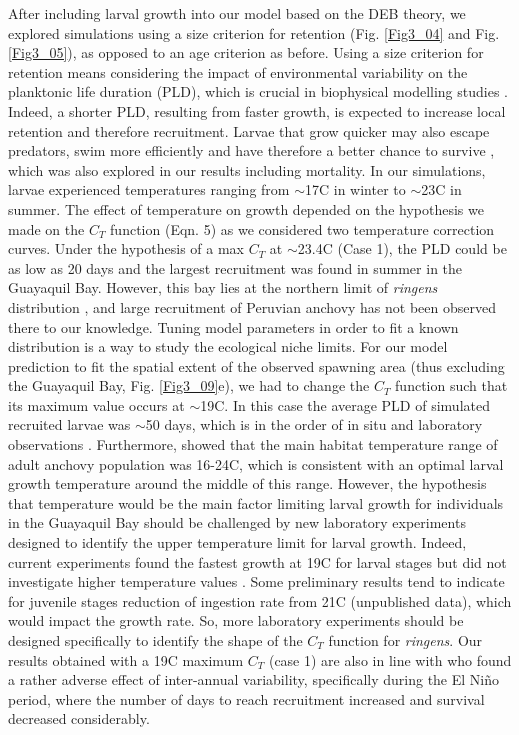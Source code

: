 After including larval growth into our model based on the DEB theory, we explored simulations using a size criterion for retention (Fig. \ref{Fig3_04} and Fig. \ref{Fig3_05}), as opposed to an age criterion as before. Using a size criterion for retention means considering the impact of environmental variability on the planktonic life duration (PLD), which is crucial in biophysical modelling studies \citep{Lett2010}. Indeed, a shorter PLD, resulting from faster growth, is expected to increase local retention and therefore recruitment. Larvae that grow quicker may also escape predators, swim more efficiently and have therefore a better chance to survive \citep{Houd2008}, which was also explored in our results including mortality. In our simulations, larvae experienced temperatures ranging from $\sim$17\textdegree C in winter to $\sim$23\textdegree C in summer. The effect of temperature on growth depended on the hypothesis we made on the $C_T$ function (Eqn. 5) as we considered two temperature correction curves. Under the hypothesis of a max $C_T$ at $\sim$23.4\textdegree C (Case 1), the PLD could be as low as 20 days and the largest recruitment was found in summer in the Guayaquil Bay. However, this bay lies at the northern limit of \textit{\gls{ringens}} distribution \citep{CaldAyor2020}, and large recruitment of Peruvian anchovy has not been observed there to our knowledge. Tuning model parameters in order to fit a known distribution is a way to study the ecological niche limits. For our model prediction to fit the spatial extent of the observed spawning area (thus excluding the Guayaquil Bay, Fig. \ref{Fig3_09}e), we had to change the $C_T$ function such that its maximum value occurs at $\sim$19\textdegree C. In this case the average PLD of simulated recruited larvae was $\sim$50 days, which is in the order of in situ and laboratory observations \citep{PaloMuck1987}. Furthermore, \citep{CastPena2022} showed that the main habitat temperature range of adult anchovy population was 16-24\textdegree C, which is consistent with an optimal larval growth temperature around the middle of this range. However, the hypothesis that temperature would be the main factor limiting larval growth for individuals in the Guayaquil Bay should be challenged by new laboratory experiments designed to identify the upper temperature limit for larval growth. Indeed, current experiments found the fastest growth at 19\textdegree C for larval stages but did not investigate higher temperature values \citep{RiouOfel2021}. Some preliminary results tend to indicate for juvenile stages reduction of ingestion rate from 21\textdegree C (unpublished data), which would impact the growth rate. So, more laboratory experiments should be designed specifically to identify the shape of the $C_T$ function for \textit{\gls{ringens}}. Our results obtained with a 19\textdegree C maximum $C_T$ (case 1) are also in line with \cite{XuChai2013} who found a rather adverse effect of inter-annual variability, specifically during the El Niño period, where the number of days to reach recruitment increased and survival decreased considerably.\\


